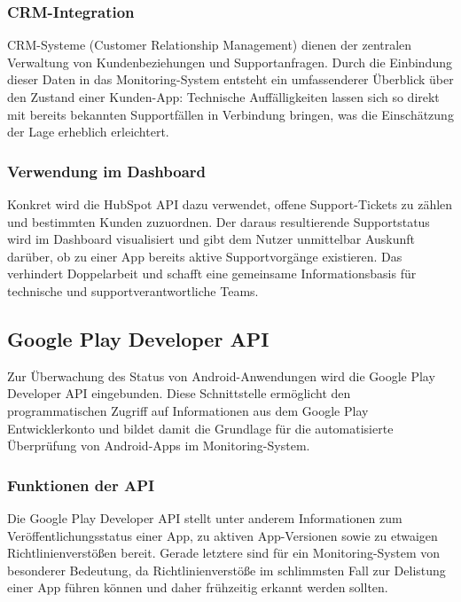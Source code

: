 \subsubsection{CRM-Integration}
CRM-Systeme (Customer Relationship Management) dienen der zentralen Verwaltung von Kundenbeziehungen und Supportanfragen. Durch die Einbindung dieser Daten in das Monitoring-System entsteht ein umfassenderer Überblick über den Zustand einer Kunden-App: Technische Auffälligkeiten lassen sich so direkt mit bereits bekannten Supportfällen in Verbindung bringen, was die Einschätzung der Lage erheblich erleichtert.

\subsubsection{Verwendung im Dashboard}
Konkret wird die HubSpot API dazu verwendet, offene Support-Tickets zu zählen und bestimmten Kunden zuzuordnen. Der daraus resultierende Supportstatus wird im Dashboard visualisiert und gibt dem Nutzer unmittelbar Auskunft darüber, ob zu einer App bereits aktive Supportvorgänge existieren. Das verhindert Doppelarbeit und schafft eine gemeinsame Informationsbasis für technische und supportverantwortliche Teams.


\subsection{Google Play Developer API}
Zur Überwachung des Status von Android-Anwendungen wird die Google Play Developer API eingebunden. Diese Schnittstelle ermöglicht den programmatischen Zugriff auf Informationen aus dem Google Play Entwicklerkonto und bildet damit die Grundlage für die automatisierte Überprüfung von Android-Apps im Monitoring-System. \cite{google_play_api}

\subsubsection{Funktionen der API}
Die Google Play Developer API stellt unter anderem Informationen zum Veröffentlichungsstatus einer App, zu aktiven App-Versionen sowie zu etwaigen Richtlinienverstößen bereit. Gerade letztere sind für ein Monitoring-System von besonderer Bedeutung, da Richtlinienverstöße im schlimmsten Fall zur Delistung einer App führen können und daher frühzeitig erkannt werden sollten.

